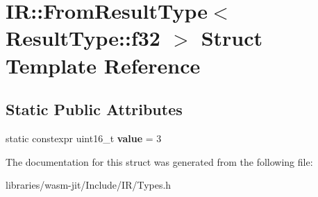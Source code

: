 \hypertarget{struct_i_r_1_1_from_result_type_3_01_result_type_1_1f32_01_4}{}\section{IR\+:\+:From\+Result\+Type$<$ Result\+Type\+:\+:f32 $>$ Struct Template Reference}
\label{struct_i_r_1_1_from_result_type_3_01_result_type_1_1f32_01_4}
\subsection*{Static Public Attributes}
\begin{DoxyCompactItemize}
\item 
\mbox{\label{struct_i_r_1_1_from_result_type_3_01_result_type_1_1f32_01_4_a53d2d5835e7d10862b003d10dd9b4cc9}} 
static constexpr uint16\+\_\+t {\bfseries value} = 3
\end{DoxyCompactItemize}


The documentation for this struct was generated from the following file\+:\begin{DoxyCompactItemize}
\item 
libraries/wasm-\/jit/\+Include/\+I\+R/Types.\+h\end{DoxyCompactItemize}

